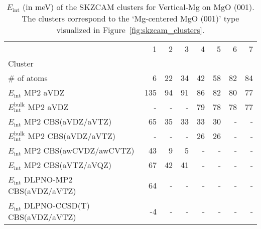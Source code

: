\begin{table}
\caption{\label{tab:system_eint_mgo_no_vertical-mg}$E_\textrm{int}$ (in meV) of the SKZCAM clusters for Vertical-Mg  on MgO (001). The clusters correspond to the `Mg-centered MgO (001)' type visualized in Figure~\ref{fig:skzcam_clusters}.}
\begin{adjustbox}{center,max width=1.4\textwidth}
\begin{tabular}{lrrrrrrr}
\toprule
 & 1 & 2 & 3 & 4 & 5 & 6 & 7 \\ 
Cluster &  &  &  &  &  &  &  \\
\midrule
\# of atoms & 6 & 22 & 34 & 42 & 58 & 82 & 84 \\
$E_\textrm{int}$ MP2 aVDZ & 135 & 94 & 91 & 86 & 82 & 80 & 77 \\
$E_\textrm{int}^\textrm{bulk}$ MP2 aVDZ & - & - & - & 79 & 78 & 78 & 77 \\
$E_\textrm{int}$ MP2 CBS(aVDZ/aVTZ) & 65 & 35 & 33 & 33 & 30 & - & - \\
$E_\textrm{int}^\textrm{bulk}$ MP2 CBS(aVDZ/aVTZ) & - & - & - & 26 & 26 & - & - \\
$E_\textrm{int}$ MP2 CBS(awCVDZ/awCVTZ) & 43 & 9 & 5 & - & - & - & - \\
$E_\textrm{int}$ MP2 CBS(aVTZ/aVQZ) & 67 & 42 & 41 & - & - & - & - \\
$E_\textrm{int}$ DLPNO-MP2 CBS(aVDZ/aVTZ) & 64 & - & - & - & - & - & - \\
$E_\textrm{int}$ DLPNO-CCSD(T) CBS(aVDZ/aVTZ) & -4 & - & - & - & - & - & - \\
\bottomrule
\end{tabular}
\end{adjustbox}
\end{table}

